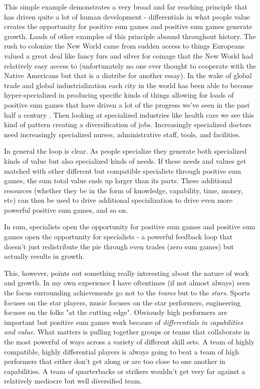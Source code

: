 \documentclass[11pt,a5paper]{book}
\begin{document}
This simple example demonstrates a very broad and far reaching principle that has driven quite a lot of human development - differentials in what people value creates the opportunity for positive sum games and positive sum games generate growth. Loads of other examples of this principle abound throughout history. The rush to colonize the New World came from sudden access to things Europeans valued a great deal like fancy furs and silver for coinage that the New World had relatively easy access to (unfortunately no one ever thought to cooperate with the Native Americans but that is a diatribe for another essay). In the wake of global trade and global industrialization each city in the world has been able to become hyper-specialized in producing specific kinds of things allowing for loads of positive sum games that have driven a lot of the progress we've seen in the past half a century \cite{zeihan}. Then looking at specialized industries like health care we see this kind of pattern creating a diversification of jobs. Increasingly specialized doctors need increasingly specialized nurses, administrative staff, tools, and facilities.
\newline

In general the loop is clear. As people specialize they generate both specialized kinds of value but also specialized kinds of needs. If these needs and values get matched with other different but compatible specialists through positive sum games, the sum total value ends up larger than its parts. These additional resources (whether they be in the form of knowledge, capability, time, money, etc) can then be used to drive additional specialization to drive even more powerful positive sum games, and so on. 
\newline

In sum, specialists open the opportunity for positive sum games and positive sum games open the opportunity for specialists - a powerful feedback loop that doesn't just redistribute the pie through even trades (zero sum games) but actually results in growth. 
\newline

This, however, points out something really interesting about the nature of work and growth. In my own experience I have oftentimes (if not almost always) seen the focus surrounding achievements go not to the \textit{teams} but to the \textit{stars}. Sports focuses on the star players, music focuses on the star performers, engineering focuses on the folks "at the cutting edge". Obviously high performers are important but positive sum games work because of \textit{differentials in capabilities and value}. What matters is pulling together groups or teams that collaborate in the most powerful of ways across a variety of different skill sets. A team of highly compatible, highly differential players is always going to beat a team of high performers that either don't get along or are too close to one another in capabilities. A team of quarterbacks or strikers wouldn't get very far against a relatively mediocre but well diversified team. 
\newline
\end{document}
